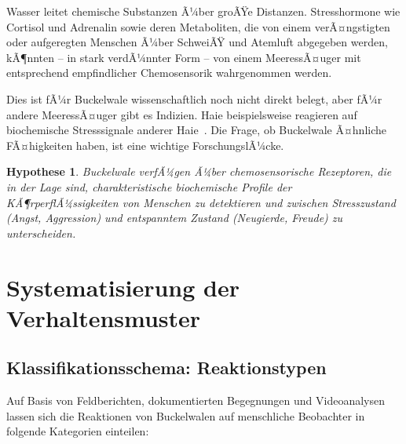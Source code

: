 ﻿\documentclass[12pt,a4paper]{article}
\newtheorem{hypothese}{Hypothese}[section]
\theoremstyle{definition}
\theoremstyle{remark}
\begin{document}
Wasser leitet chemische Substanzen Ã¼ber groÃŸe Distanzen. Stresshormone wie
Cortisol und Adrenalin sowie deren Metaboliten, die von einem verÃ¤ngstigten
oder aufgeregten Menschen Ã¼ber SchweiÃŸ und Atemluft abgegeben werden, kÃ¶nnten
-- in stark verdÃ¼nnter Form -- von einem MeeressÃ¤uger mit entsprechend empfindlicher
Chemosensorik wahrgenommen werden.

Dies ist fÃ¼r Buckelwale wissenschaftlich noch nicht direkt belegt, aber fÃ¼r
andere MeeressÃ¤uger gibt es Indizien. Haie beispielsweise reagieren auf
biochemische Stresssignale anderer Haie~\cite{smith1992alarm}. Die Frage,
ob Buckelwale Ã¤hnliche FÃ¤higkeiten haben, ist eine wichtige ForschungslÃ¼cke.

\begin{hypothese}
  \label{hyp:chemo}
  Buckelwale verfÃ¼gen Ã¼ber chemosensorische Rezeptoren, die in der Lage sind,
  charakteristische biochemische Profile der KÃ¶rperflÃ¼ssigkeiten von Menschen
  zu detektieren und zwischen Stresszustand (Angst, Aggression) und
  entspanntem Zustand (Neugierde, Freude) zu unterscheiden.
\end{hypothese}

\section{Systematisierung der Verhaltensmuster}
\label{sec:verhalten}

\subsection{Klassifikationsschema: Reaktionstypen}

Auf Basis von Feldberichten, dokumentierten Begegnungen und Videoanalysen
lassen sich die Reaktionen von Buckelwalen auf menschliche Beobachter in
folgende Kategorien einteilen:
\end{document}

